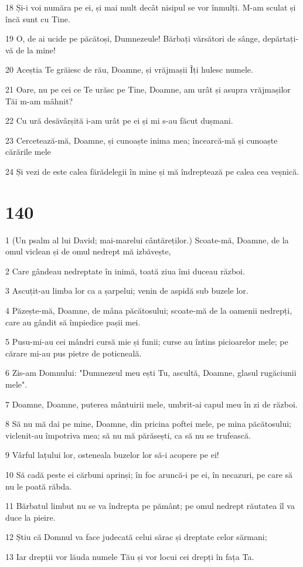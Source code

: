 \par 18 Și-i voi număra pe ei, și mai mult decât nisipul se vor înmulți. M-am sculat și încă sunt cu Tine.
\par 19 O, de ai ucide pe păcătoși, Dumnezeule! Bărbați vărsători de sânge, depărtați-vă de la mine!
\par 20 Aceștia Te grăiesc de rău, Doamne, și vrăjmașii Îți hulesc numele.
\par 21 Oare, nu pe cei ce Te urăsc pe Tine, Doamne, am urât și asupra vrăjmașilor Tăi m-am mâhnit?
\par 22 Cu ură desăvârșită i-am urât pe ei și mi s-au făcut dușmani.
\par 23 Cercetează-mă, Doamne, și cunoaște inima mea; încearcă-mă și cunoaște cărările mele
\par 24 Și vezi de este calea fărădelegii în mine și mă îndreptează pe calea cea veșnică.

\chapter{140}

\par 1 (Un psalm al lui David; mai-marelui cântăreților.) Scoate-mă, Doamne, de la omul viclean și de omul nedrept mă izbăvește,
\par 2 Care gândeau nedreptate în inimă, toată ziua îmi duceau război.
\par 3 Ascuțit-au limba lor ca a șarpelui; venin de aspidă sub buzele lor.
\par 4 Păzește-mă, Doamne, de mâna păcătosului; scoate-mă de la oamenii nedrepți, care au gândit să împiedice pașii mei.
\par 5 Pusu-mi-au cei mândri cursă mie și funii; curse au întins picioarelor mele; pe cărare mi-au pus pietre de poticneală.
\par 6 Zis-am Domnului: "Dumnezeul meu ești Tu, ascultă, Doamne, glasul rugăciunii mele".
\par 7 Doamne, Doamne, puterea mântuirii mele, umbrit-ai capul meu în zi de război.
\par 8 Să nu mă dai pe mine, Doamne, din pricina poftei mele, pe mina păcătosului; viclenit-au împotriva mea; să nu mă părăsești, ca să nu se trufească.
\par 9 Vârful lațului lor, osteneala buzelor lor să-i acopere pe ei!
\par 10 Să cadă peste ei cărbuni aprinși; în foc aruncă-i pe ei, în necazuri, pe care să nu le poată răbda.
\par 11 Bărbatul limbut nu se va îndrepta pe pământ; pe omul nedrept răutatea îl va duce la pieire.
\par 12 Știu că Domnul va face judecată celui sărac și dreptate celor sărmani;
\par 13 Iar drepții vor lăuda numele Tău și vor locui cei drepți în fața Ta.

